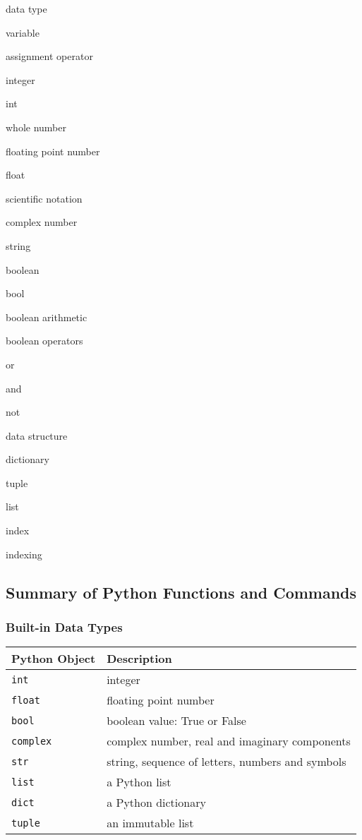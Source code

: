 \documentclass{book}
\newenvironment{key_terms}{\begin{multicols}{3}}{\end{multicols}} %
\newcommand{\passthrough}[1]{#1}
\begin{document}
    
        \begin{key_terms}
        data type

variable

assignment operator

integer

int

whole number

floating point number

float

scientific notation

complex number

string

boolean

bool

boolean arithmetic

boolean operators

or

and

not

data structure

dictionary

tuple

list

index

indexing
        \end{key_terms}

    




    
        \hypertarget{summary-of-python-functions-and-commands}{%
\subsection{Summary of Python Functions and
Commands}\label{summary-of-python-functions-and-commands}}
    




    
        \hypertarget{built-in-data-types}{%
\subsubsection{Built-in Data Types}\label{built-in-data-types}}

\begin{longtable}[]{@{}ll@{}}
\toprule
Python Object & Description\tabularnewline
\midrule
\endhead
\passthrough{\lstinline!int!} & integer\tabularnewline
\passthrough{\lstinline!float!} & floating point number\tabularnewline
\passthrough{\lstinline!bool!} & boolean value: True or
False\tabularnewline
\passthrough{\lstinline!complex!} & complex number, real and imaginary
components\tabularnewline
\passthrough{\lstinline!str!} & string, sequence of letters, numbers and
symbols\tabularnewline
\passthrough{\lstinline!list!} & a Python list\tabularnewline
\passthrough{\lstinline!dict!} & a Python dictionary\tabularnewline
\passthrough{\lstinline!tuple!} & an immutable list\tabularnewline
\bottomrule
\end{longtable}
\end{document}
